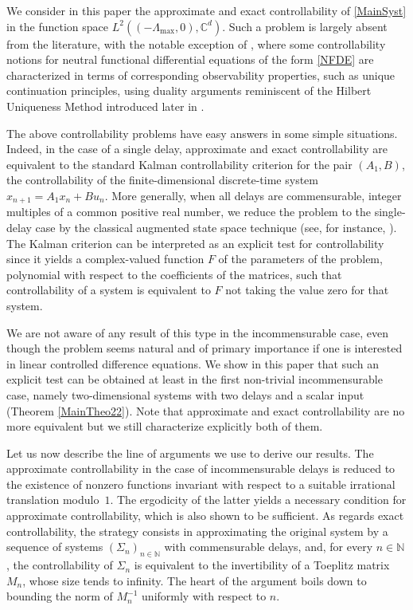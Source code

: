 \documentclass[JEP,XML,SOM,Unicode]{cedram}
\theoremstyle{plain}
\theoremstyle{definition}
\begin{document}
We consider in this paper the approximate and exact controllability of \eqref{MainSyst} in the function space $L^2((-\Lambda_{\max}, 0), \mathbb C^d)$. Such a problem is largely absent from the literature, with the notable exception of \cite{Salamon1984Control, OConnor1983Function}, where some controllability notions for neutral functional differential equations of the form \eqref{NFDE} are characterized in terms of corresponding observability properties, such as unique continuation principles, using duality arguments reminiscent of the Hilbert Uniqueness Method introduced later in \cite{Lions1986Controlabilite, Lions1988Exact}.

The above controllability problems have easy answers in some simple situations. \hbox{Indeed}, in the case of a single delay, approximate and exact controllability are equivalent to the standard Kalman controllability criterion for the pair $(A_1, B)$, \ie the controllability of the finite-dimensional discrete-time system $x_{n+1} = A_1 x_n + B u_n$. More generally, when all delays are commensurable, \ie integer multiples of a common positive real number, we reduce the problem to the single-delay case by the classical augmented state space technique (see, for instance, \cite[Chap.\,4]{Franklin1997Digital}). The Kalman criterion can be interpreted as an explicit test for controllability since it yields a complex-valued function $F$ of the parameters of the problem, polynomial with respect to the coefficients of the matrices, such that controllability of a system is equivalent to $F$ not taking the value zero for that system.

We are not aware of any result of this type in the incommensurable case, even though the problem seems natural and of primary importance if one is interested in linear controlled difference equations. We show in this paper that such an explicit test can be obtained at least in the first non-trivial incommensurable case, namely two-dimensional systems with two delays and a scalar input (Theorem \ref{MainTheo22}). Note that approximate and exact controllability are no more equivalent but we still characterize explicitly both of them.

Let us now describe the line of arguments we use to derive our results. The approx\-imate controllability in the case of incommensurable delays is reduced to the existence of nonzero functions invariant with respect to a suitable irrational translation modulo~$1$. The ergodicity of the latter yields a necessary condition for approximate controllability, which is also shown to be sufficient. As regards exact controllability, the strategy consists in approximating the original system by a sequence of systems $(\Sigma_n)_{n \in \mathbb N}$ with commensurable delays, and, for every $n \in \mathbb N$, the controllability of $\Sigma_n$ is equivalent to the invertibility of a Toeplitz matrix $M_n$, whose size tends to infinity. The heart of the argument boils down to bounding the norm of $M_n^{-1}$ uniformly with respect to $n$.
\end{document}
